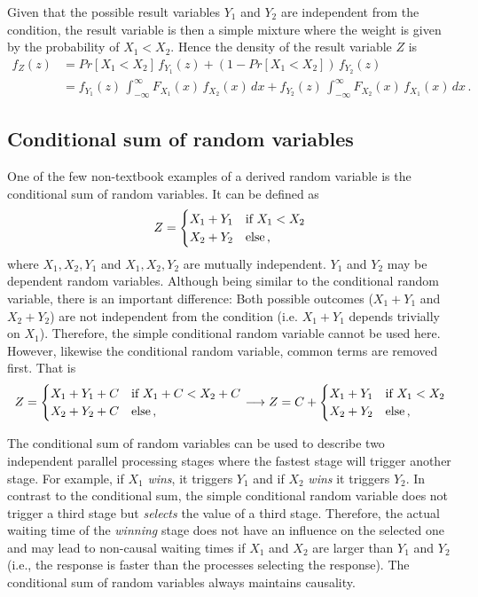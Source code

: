 Given that the possible result variables $Y_1$
and $Y_2$ are independent from the condition, the result variable is then a simple mixture where the weight
is given by the probability of $X_1<X_2$. Hence the density of the result variable $Z$ is
\begin{align}
 f_Z(z) &= Pr[X_1<X_2]\,f_{Y_1}(z) + \left(1-Pr[X_1<X_2]\right)\,f_{Y_2}(z) \nonumber \\
    &= f_{Y_1}(z)\,\int_{-\infty}^{\infty}F_{X_1}(x)\,f_{X_2}(x)\,dx + 
    f_{Y_2}(z)\,\int_{-\infty}^{\infty}F_{X_2}(x)\,f_{X_1}(x)\,dx\,.\nonumber
\end{align}

\subsection{Conditional sum of random variables}
One of the few non-textbook examples of a derived random variable is the conditional sum of random variables. 
It can be defined as
\begin{equation}
 Z = \begin{cases}
   X_1 + Y_1 & \mbox{if } X_1 < X_2\\
   X_2 + Y_2 & \mbox{else\,,} 
 \end{cases} \nonumber
\end{equation}
where $X_1, X_2, Y_1$ and $X_1, X_2, Y_2$ are mutually independent. $Y_1$ and $Y_2$ may be 
dependent random variables. Although being similar to the conditional random variable, there is an 
important difference: Both possible outcomes ($X_1+Y_1$ and $X_2+Y_2$) 
are not independent from the condition (i.e. $X_1+Y_1$ depends trivially on $X_1$).
Therefore, the simple conditional random variable cannot be used here. However, likewise the
conditional random variable, common terms are removed first. That is
\begin{equation}
 Z = \begin{cases}
   X_1 + Y_1 + C& \mbox{if } X_1 + C < X_2 + C\\
   X_2 + Y_2 + C& \mbox{else\,,} 
 \end{cases} \longrightarrow 
 Z = C + \begin{cases}
   X_1 + Y_1 & \mbox{if } X_1 < X_2\\
   X_2 + Y_2 & \mbox{else\,,} 
 \end{cases} \nonumber
\end{equation}


The conditional sum of random variables can be used to describe two independent parallel processing
stages where the fastest stage will trigger another stage. For example, if $X_1$ \emph{wins}, it triggers $Y_1$
and if $X_2$ \emph{wins} it triggers $Y_2$. In contrast to the conditional sum, the 
simple conditional random variable does not trigger a third stage but \emph{selects} the value of a third stage. 
Therefore, the actual waiting time of the \emph{winning} stage does not have an influence on the 
selected one and may lead to non-causal waiting times if $X_1$ and $X_2$ are larger than $Y_1$ and
$Y_2$ (i.e., the response is faster than the processes selecting the response). The conditional sum
of random variables always maintains causality.  	

